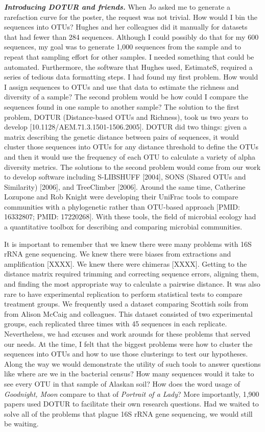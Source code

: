 \documentclass[11pt,]{article}
\begin{document}
\textbf{\emph{Introducing DOTUR and friends.}} When Jo asked me to
generate a rarefaction curve for the poster, the request was not
trivial. How would I bin the sequences into OTUs? Hughes and her
colleagues did it manually for datasets that had fewer than 284
sequences. Although I could possibly do that for my 600 sequences, my
goal was to generate 1,000 sequences from the sample and to repeat that
sampling effort for other samples. I needed something that could be
automated. Furthermore, the software that Hughes used, EstimateS,
required a series of tedious data formatting steps. I had found my first
problem. How would I assign sequences to OTUs and use that data to
estimate the richness and diversity of a sample? The second problem
would be how could I compare the sequences found in one sample to
another sample? The solution to the first problem, DOTUR (Distance-based
OTUs and Richness), took us two years to develop
{[}10.1128/AEM.71.3.1501-1506.2005{]}. DOTUR did two things: given a
matrix describing the genetic distance between pairs of sequences, it
would cluster those sequences into OTUs for any distance threshold to
define the OTUs and then it would use the frequency of each OTU to
calculate a variety of alpha diversity metrics. The solutions to the
second problem would come from our work to develop software including
S-LIBSHUFF {[}2004{]}, SONS (Shared OTUs and Similarity) {[}2006{]}, and
TreeClimber {[}2006{]}. Around the same time, Catherine Lozupone and Rob
Knight were developing their UniFrac tools to compare communities with a
phylogenetic rather than OTU-based approach {[}PMID: 16332807; PMID:
17220268{]}. With these tools, the field of microbial ecology had a
quantitative toolbox for describing and comparing microbial communities.

It is important to remember that we knew there were many problems with
16S rRNA gene sequencing. We knew there were biases from extractions and
amplification {[}XXXX{]}. We knew there were chimeras {[}XXXX{]}.
Getting to the distance matrix required trimming and correcting sequence
errors, aligning them, and finding the most appropriate way to calculate
a pairwise distance. It was also rare to have experimental replication
to perform statistical tests to compare treatment groups. We frequently
used a dataset comparing Scottish soils from from Alison McCaig and
colleagues. This dataset consisted of two experimental groups, each
replicated three times with 45 sequences in each replicate.
Nevertheless, we had excuses and work arounds for these problems that
served our needs. At the time, I felt that the biggest problems were how
to cluster the sequences into OTUs and how to use those clusterings to
test our hypotheses. Along the way we would demonstrate the utility of
such tools to answer questions like where are we in the bacterial
census? How many sequences would it take to see every OTU in that sample
of Alaskan soil? How does the word usage of \emph{Goodnight, Moon}
compare to that of \emph{Portrait of a Lady}? More importantly, 1,900
papers used DOTUR to facilitate their own research questions. Had we
waited to solve all of the problems that plague 16S rRNA gene
sequencing, we would still be waiting.
\end{document}
